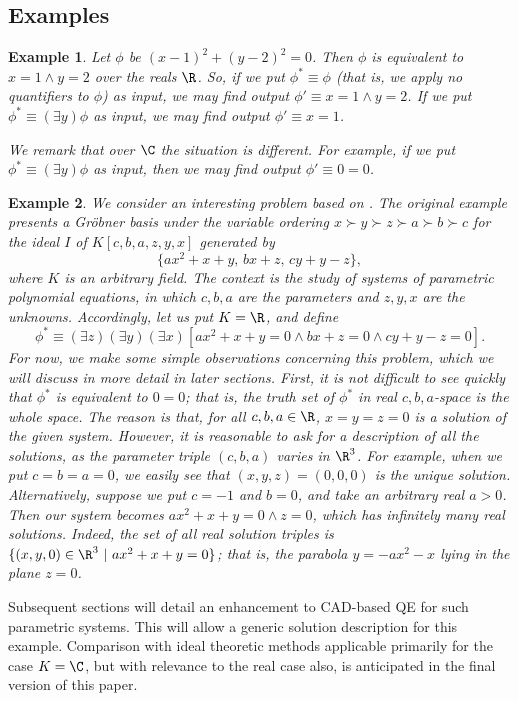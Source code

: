 \documentclass{article}
\newtheorem{example}{Example}
\begin{document}
\subsection{Examples}

\begin{example}
Let $\phi$ be $(x-1)^2+(y-2)^2=0$. Then $\phi$ is equivalent to $x=1 \wedge y=2$ over the reals $\R$. So, if we put $\phi^* \equiv \phi$ (that is, we apply no quantifiers to $\phi$) as input, we may find output $\phi' \equiv x = 1 \wedge y = 2$. If we put $\phi^* \equiv (\exists y) \phi$ as input, we may find output $\phi' \equiv x = 1$.

We remark that over $\C$ the situation is different. For example, if we put $\phi^* \equiv (\exists y) \phi$ as input, then we may find output $\phi' \equiv 0=0$.
\end{example}

\begin{example}
We consider an interesting problem based on \cite[Example 3.11]{FGT01}. The original example presents a Gr\"obner basis under the variable ordering 
$x \succ y \succ z \succ a \succ b \succ c$ for the ideal $I$  of $K[c,b,a,z,y,x]$ generated by
\[
\{a x^2 + x + y, \, b x + z, \, c y + y - z\},
\]
where $K$ is an arbitrary field. The context is the study of systems of parametric polynomial equations, in which $c,b,a$ are the parameters and $z,y,x$ are the unknowns. Accordingly, let us put $K = \R$, and define
\[
\phi^* \equiv (\exists z)(\exists y)(\exists x) [a x^2 + x + y = 0 
                                           \wedge b x + z = 0
                                           \wedge c y  + y - z = 0].
\]
For now, we make some simple observations concerning this problem, which 
we will discuss in more detail in later sections. First, it is not 
difficult to see quickly that $\phi^*$ is equivalent to $0=0$; that is, 
the truth set of $\phi^*$ in real $c,b,a$-space is the whole space. The reason is that, for all $c,b,a \in \R$, $x = y = z = 0$ is a solution of the given system. However, it is reasonable to ask for a description of all the solutions, as the parameter triple $(c,b,a)$ varies in $\R^3$. For example, when we put $c = b = a = 0$, we easily see that $(x,y,z) = (0,0,0)$ is the unique solution. 
Alternatively, suppose we put $c = -1$ and $b = 0$,
and take an arbitrary real $a > 0$. 
Then our system becomes $a x^2 + x + y = 0 \wedge z = 0$, which has infinitely many real solutions. Indeed, the set of all real solution triples 
is $\{(x,y,0) \in \R^3~|~a x^2 + x + y = 0\}$; that is, the parabola
$y = -a x^2 - x$ lying in the plane $z = 0$.
\end{example}
Subsequent sections will detail an enhancement to CAD-based QE for such parametric systems. This will allow a generic solution description for this example. Comparison with ideal theoretic methods applicable primarily for the case $K = \C$, but with relevance to the real case also, is anticipated in the final version of this paper.
\end{document}
